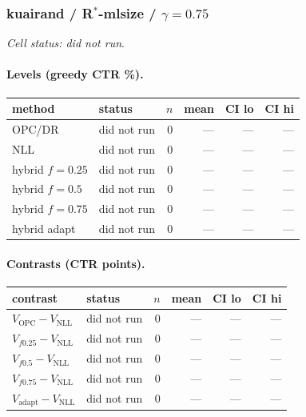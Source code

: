 \documentclass[10pt,a4paper]{article}
\begin{document}
\subsubsection{kuairand / R$^*$-mlsize / $\gamma=0.75$}
\emph{Cell status: did not run}.
\paragraph{Levels (greedy CTR \%).}
{\centering\small\begin{tabular}{llrrrr}
\toprule method & status & $n$ & mean & CI lo & CI hi \\
\midrule
OPC/DR & did not run & 0 & --- & --- & --- \\
NLL & did not run & 0 & --- & --- & --- \\
hybrid $f{=}0.25$ & did not run & 0 & --- & --- & --- \\
hybrid $f{=}0.5$ & did not run & 0 & --- & --- & --- \\
hybrid $f{=}0.75$ & did not run & 0 & --- & --- & --- \\
hybrid adapt & did not run & 0 & --- & --- & --- \\
\bottomrule\end{tabular}\par}
\paragraph{Contrasts (CTR points).}
{\centering\small\begin{tabular}{llrrrr}
\toprule contrast & status & $n$ & mean & CI lo & CI hi \\
\midrule
$V_{\mathrm{OPC}}-V_{\mathrm{NLL}}$ & did not run & 0 & --- & --- & --- \\
$V_{f0.25}-V_{\mathrm{NLL}}$ & did not run & 0 & --- & --- & --- \\
$V_{f0.5}-V_{\mathrm{NLL}}$ & did not run & 0 & --- & --- & --- \\
$V_{f0.75}-V_{\mathrm{NLL}}$ & did not run & 0 & --- & --- & --- \\
$V_{\mathrm{adapt}}-V_{\mathrm{NLL}}$ & did not run & 0 & --- & --- & --- \\
\bottomrule\end{tabular}\par}
\end{document}
